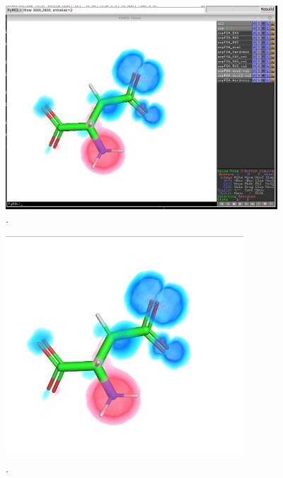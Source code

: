 \documentclass[a4paper,11pt]{refart}
\begin{document}
\hspace*{-\leftmarginwidth}
\begin{minipage}{\fullwidth}
	\begin{figure}[H]
		\begin{center}
			\includegraphics[width=4in]{images/tut4_img10}
			\caption{.}
			\label{fig_tut4_8}
		\end{center}
	\end{figure}
\end{minipage}

\hspace*{-\leftmarginwidth}
\begin{minipage}{\fullwidth}
	\begin{figure}[H]
		\begin{center}
			\includegraphics[width=3.5in]{images/tut4_img11}
			\caption{.}
			\label{fig_tut4_9}
		\end{center}
	\end{figure}
\end{minipage}
\end{document}
